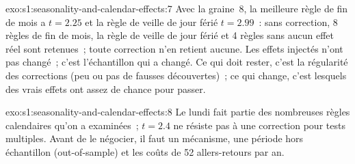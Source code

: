 \begin{solution}{exo:s1:seasonality-and-calendar-effects:7}
Avec la graine~8, la meilleure règle de fin de mois a $t = 2.25$ et la règle de veille de jour férié $t = 2.99$~: sans correction, 8 règles de fin de mois, la règle de veille de jour férié
et 4 règles sans aucun effet réel sont retenues~; toute correction n'en retient aucune. Les effets injectés n'ont pas changé~; c'est l'échantillon qui a changé. Ce qui doit rester, c'est la
régularité des corrections (peu ou pas de fausses découvertes)~; ce qui change, c'est lesquels des vrais effets ont assez de chance pour passer.
\end{solution}

\begin{solution}{exo:s1:seasonality-and-calendar-effects:8}
Le lundi fait partie des nombreuses règles calendaires qu'on a examinées~; $t = 2.4$ ne résiste pas à une correction pour tests multiples. Avant de le négocier, il faut un mécanisme, une période
hors échantillon (out-of-sample) et les coûts de 52 allers-retours par an.
\end{solution}


